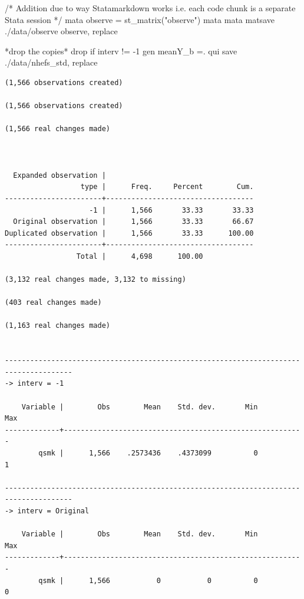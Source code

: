 \documentclass[
  10pt,
  a4paper,
]{book}
\newenvironment{Shaded}{\begin{snugshade}}{\end{snugshade}}
\newcommand{\CommentTok}[1]{\textcolor[rgb]{0.37,0.37,0.37}{#1}}
\newcommand{\KeywordTok}[1]{\textcolor[rgb]{0.00,0.46,0.62}{#1}}
\newcommand{\NormalTok}[1]{\textcolor[rgb]{0.00,0.46,0.62}{#1}}
\newcommand{\StringTok}[1]{\textcolor[rgb]{0.13,0.47,0.30}{#1}}
\begin{document}
\begin{Shaded}
\begin{Highlighting}[]
\CommentTok{/* Addition due to way Statamarkdown works }
\CommentTok{i.e. each code chunk is a separate Stata session */}
\KeywordTok{mata}\NormalTok{ observe = st\_matrix(}\StringTok{"observe"}\NormalTok{)}
\KeywordTok{mata} \KeywordTok{mata}\NormalTok{ matsave ./}\KeywordTok{data}\NormalTok{/observe observe, }\KeywordTok{replace}

\NormalTok{*}\KeywordTok{drop}\NormalTok{ the copies*}
\KeywordTok{drop} \KeywordTok{if}\NormalTok{ interv != {-}1}
\KeywordTok{gen}\NormalTok{ meanY\_b =.}
\KeywordTok{qui} \KeywordTok{save}\NormalTok{ ./}\KeywordTok{data}\NormalTok{/nhefs\_std, }\KeywordTok{replace}
\end{Highlighting}
\end{Shaded}

\begin{verbatim}
(1,566 observations created)

(1,566 observations created)

(1,566 real changes made)



  Expanded observation |
                  type |      Freq.     Percent        Cum.
-----------------------+-----------------------------------
                    -1 |      1,566       33.33       33.33
  Original observation |      1,566       33.33       66.67
Duplicated observation |      1,566       33.33      100.00
-----------------------+-----------------------------------
                 Total |      4,698      100.00

(3,132 real changes made, 3,132 to missing)

(403 real changes made)

(1,163 real changes made)


--------------------------------------------------------------------------------------
-> interv = -1

    Variable |        Obs        Mean    Std. dev.       Min        Max
-------------+---------------------------------------------------------
        qsmk |      1,566    .2573436    .4373099          0          1

--------------------------------------------------------------------------------------
-> interv = Original

    Variable |        Obs        Mean    Std. dev.       Min        Max
-------------+---------------------------------------------------------
        qsmk |      1,566           0           0          0          0


\end{verbatim}
\end{document}
